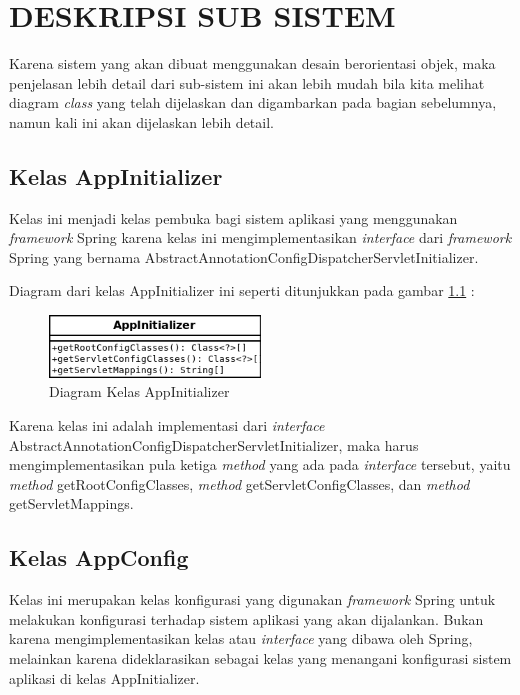 \chapter{DESKRIPSI SUB SISTEM}

Karena sistem yang akan dibuat menggunakan desain berorientasi objek, maka penjelasan lebih detail dari sub-sistem ini akan lebih mudah bila kita melihat diagram \textit{class} yang telah dijelaskan dan digambarkan pada bagian sebelumnya, namun kali ini akan dijelaskan lebih detail.

\section{Kelas AppInitializer}

Kelas ini menjadi kelas pembuka bagi sistem aplikasi yang menggunakan \textit{framework} Spring karena kelas ini mengimplementasikan \textit{interface} dari \textit{framework} Spring yang bernama AbstractAnnotationConfigDispatcherServletInitializer.

Diagram dari kelas AppInitializer ini seperti ditunjukkan pada gambar \ref{fig:uml-class-AppInitializer} :

\begin{figure}[H]
  \centering
  \includegraphics[width=0.5\textwidth]{./resources/uml/uml-class-AppInitializer}
  \caption{Diagram Kelas AppInitializer}
  \label{fig:uml-class-AppInitializer}
\end{figure}

Karena kelas ini adalah implementasi dari \textit{interface} AbstractAnnotationConfigDispatcherServletInitializer, maka harus mengimplementasikan pula ketiga \textit{method} yang ada pada \textit{interface} tersebut, yaitu \textit{method} getRootConfigClasses, \textit{method} getServletConfigClasses, dan \textit{method} getServletMappings.

\section{Kelas AppConfig}

Kelas ini merupakan kelas konfigurasi yang digunakan \textit{framework} Spring untuk melakukan konfigurasi terhadap sistem aplikasi yang akan dijalankan. Bukan karena mengimplementasikan kelas atau \textit{interface} yang dibawa oleh Spring, melainkan karena dideklarasikan sebagai kelas yang menangani konfigurasi sistem aplikasi di kelas AppInitializer.

